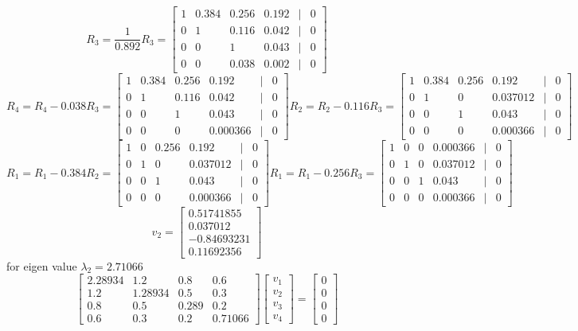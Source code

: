 \documentclass[a3paper,12pt]{extarticle} %
\begin{document}
\begin{enumerate}
\begin{enumerate}
\[        R_3 = \frac{1}{0.892}R_3 = \begin{bmatrix}1 & 0.384 & 0.256 & 0.192 & | & 0\\0 & 1 & 0.116 & 0.042 & | & 0\\0 & 0 & 1 & 0.043 & | & 0\\0 & 0 & 0.038 & 0.002 & | & 0\end{bmatrix}
        \]
        \[
        R_4 = R_4 - 0.038R_3 = \begin{bmatrix}1 & 0.384 & 0.256 & 0.192 & | & 0\\0 & 1 & 0.116 & 0.042 & | & 0\\0 & 0 & 1 & 0.043 & | & 0\\0 & 0 & 0 & 0.000366 & | & 0\end{bmatrix}
        R_2 = R_2 - 0.116R_3 = \begin{bmatrix}1 & 0.384 & 0.256 & 0.192 & | & 0\\0 & 1 & 0 & 0.037012 & | & 0\\0 & 0 & 1 & 0.043 & | & 0\\0 & 0 & 0 & 0.000366 & | & 0\end{bmatrix}
        \]
        \[
        R_1 = R_1 - 0.384R_2 =  \begin{bmatrix}1 & 0 & 0.256 & 0.192 & | & 0\\0 & 1 & 0 & 0.037012 & | & 0\\0 & 0 & 1 & 0.043 & | & 0\\0 & 0 & 0 & 0.000366 & | & 0\end{bmatrix}
        R_1 = R_1 - 0.256R_3 =  \begin{bmatrix}1 & 0 & 0 & 0.000366 & | & 0\\0 & 1 & 0 & 0.037012 & | & 0\\0 & 0 & 1 & 0.043 & | & 0\\0 & 0 & 0 & 0.000366 & | & 0\end{bmatrix}
        \]
        \[
        v_2 = \begin{bmatrix}0.51741855\\0.037012\\-0.84693231\\0.11692356\end{bmatrix}
        \]
        for eigen value \(\lambda_2 = 2.71066\)
        \[
        \begin{bmatrix}2.28934 & 1.2 & 0.8 & 0.6\\1.2 & 1.28934 & 0.5 & 0.3\\0.8 & 0.5 & 0.289 & 0.2\\0.6 & 0.3 & 0.2 & 0.71066\end{bmatrix} \begin{bmatrix}v_1\\v_2\\v_3\\v_4\end{bmatrix} = \begin{bmatrix}0\\0\\0\\0\end{bmatrix}
\]
\end{enumerate}
\end{enumerate}
\end{document}

